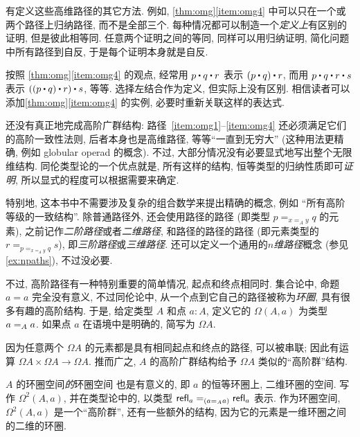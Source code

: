 \begin{rmk}
    有定义这些高维路径的其它方法.
    例如, \cref{thm:omg}\ref{item:omg4} 中可以只在一个或两个路径上归纳路径, 而不是全部三个.
    每种情况都可以制造一个\emph{定义上}有区别的证明, 但是彼此相等同.
    任意两个证明之间的等同, 同样可以用归纳证明, 简化问题中所有路径到自反, 于是每个证明本身就是自反.
\end{rmk}

按照 \cref{thm:omg}\ref{item:omg4} 的观点, 经常用 $p\ct q\ct r$ 表示 $(p\ct q)\ct r$, 而用 $p\ct q\ct r \ct s$ 表示 $((p\ct q)\ct r)\ct s$, 等等.
选择左结合作为定义, 但实际上没有区别.
相信读者可以添加\cref{thm:omg}\ref{item:omg4} 的实例, 必要时重新关联这样的表达式.

还没有真正地完成高阶广群结构: 路径~\ref{item:omg1}--\ref{item:omg4} 还必须满足它们的高阶一致性法则, 后者本身也是高维路径,
%
%
%
%
等等``一直到无穷大'' (这种用法更精确, 例如 globular operad 的概念).
不过, 大部分情况没有必要显式地写出整个无限维结构.
同伦类型论的一个优点就是, 所有这样的结构, 恒等类型的归纳性质即可\emph{证明}, 所以显式的程度可以根据需要来确定.

特别地, 这本书中不需要涉及复杂的组合数学来提出精确的概念, 例如 ``所有高阶等级的一致结构''.
除普通路径外, 还会使用路径的路径 (即类型 $p =_{x=_A y} q$ 的元素), 之前记作\emph{二阶路径}或者\emph{二维路径}, 和路径的路径的路径 (即元素类型的 $r = _{p =_{x=_A y} q} s$), 即\emph{三阶路径}或\emph{三维路径}.
还可以定义一个通用的\emph{$n$维路径}概念
%
%
(参见\cref{ex:npaths}), 不过没必要.

不过, 高阶路径有一种特别重要的简单情况, 起点和终点相同时.
集合论中, 命题 $a=a$ 完全没有意义, 不过同伦论中, 从一个点到它自己的路径被称为\emph{环圈}, 具有很多有趣的高阶结构.
于是, 给定类型 $A$ 和点 $a:A$, 定义它的
%
$\Omega(A,a)$ 为类型 $\id[A]{a}{a}$.
如果点 $a$ 在语境中是明确的, 简写为 $\Omega A$.

因为任意两个 $\Omega A$ 的元素都是具有相同起点和终点的路径, 可以被串联;
因此有运算 $\Omega A\times \Omega A\to \Omega A$.
推而广之, $A$ 的高阶广群结构给予 $\Omega A$ 类似的``高阶群''结构.

$A$ 的环圈空间\emph{的}环圈空间%
%
%
也是有意义的, 即 $a$ 的恒等环圈上, 二维环圈的空间.
写作 $\Omega^2(A,a)$, 并在类型论中的, 以类型 $\id[({\id[A]{a}{a}})]{\refl{a}}{\refl{a}}$ 表示.
作为环圈空间, $\Omega^2(A,a)$ 是一个``高阶群'', 还有一些额外的结构, 因为它的元素是一维环圈之间的二维的环圈.

